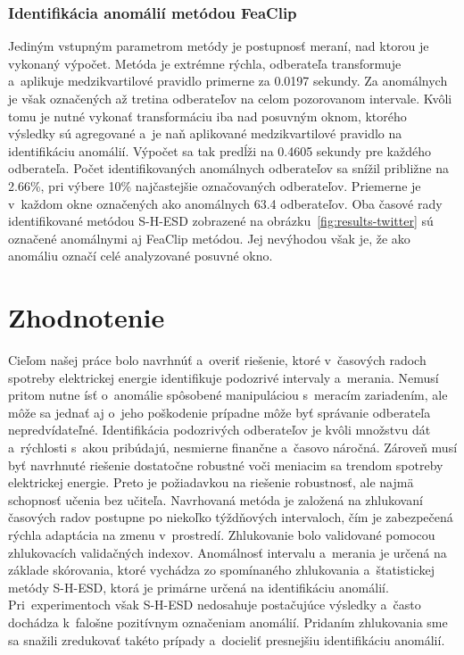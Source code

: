 \documentclass[a4paper,twoside,slovak,12pt,appendix]{article}
\begin{document}
\subsubsection{Identifikácia anomálií metódou FeaClip}
Jediným vstupným parametrom metódy je postupnosť meraní, nad ktorou je vykonaný
výpočet. Metóda je extrémne rýchla, odberateľa transformuje a~aplikuje
medzikvartilové pravidlo primerne za 0.0197 sekundy. Za anomálnych je však
označených až tretina odberateľov na celom pozorovanom intervale. Kvôli tomu je
nutné vykonať transformáciu iba nad posuvným oknom, ktorého výsledky sú
agregované a~je naň aplikované medzikvartilové pravidlo na identifikáciu
anomálií. Výpočet sa tak predĺži na 0.4605 sekundy pre každého odberateľa. Počet
identifikovaných anomálnych odberateľov sa snížil približne na 2.66\%, pri
výbere 10\% najčastejšie označovaných odberateľov. Priemerne je v~každom okne
označených ako anomálnych 63.4 odberateľov. Oba časové rady identifikované
metódou S-H-ESD zobrazené na obrázku~\ref{fig:results-twitter} sú označené
anomálnymi aj FeaClip metódou. Jej nevýhodou však je, že ako anomáliu označí
celé analyzované posuvné okno.


\newpage
\section{Zhodnotenie}
\label{c:evaluation}
Cieľom našej práce bolo navrhnúť a~overiť riešenie, ktoré v~časových radoch
spotreby elektrickej energie identifikuje podozrivé intervaly a~merania. Nemusí
pritom nutne ísť o~anomálie spôsobené manipuláciou s~meracím zariadením, ale
môže sa jednať aj o~jeho poškodenie prípadne môže byť správanie odberateľa
nepredvídateľné. Identifikácia podozrivých odberateľov je kvôli množstvu dát
a~rýchlosti s~akou pribúdajú, nesmierne finančne a~časovo náročná. Zároveň musí
byť navrhnuté riešenie dostatočne robustné voči meniacim sa trendom spotreby
elektrickej energie. Preto je požiadavkou na riešenie robustnosť, ale najmä
schopnosť učenia bez učiteľa. Navrhovaná metóda je založená na zhlukovaní
časových radov postupne po niekoľko týždňových intervaloch, čím je zabezpečená
rýchla adaptácia na zmenu v~prostredí. Zhlukovanie bolo validované pomocou
zhlukovacích validačných indexov. Anomálnosť intervalu a~merania je určená na
základe skórovania, ktoré vychádza zo spomínaného zhlukovania a~štatistickej
metódy S-H-ESD, ktorá je primárne určená na identifikáciu anomálií.
Pri~experimentoch však S-H-ESD nedosahuje postačujúce výsledky a~často dochádza
k~falošne pozitívnym označeniam anomálií. Pridaním zhlukovania sme sa snažili
zredukovať takéto prípady a~docieliť presnejšiu identifikáciu anomálií.
\end{document}
